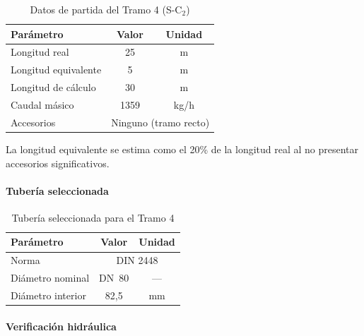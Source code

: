 \documentclass[12pt]{article}
\begin{document}
\begin{table}[H]
	\centering
	\caption{Datos de partida del Tramo 4 (S-C$_2$)}
	\label{tab:datos-tramo4}
	\begin{tabular}{lcc}
		\toprule
		\textbf{Parámetro}   & \textbf{Valor}                            & \textbf{Unidad} \\
		\midrule
		Longitud real        & 25                                        & m               \\
		Longitud equivalente & 5                                         & m               \\
		Longitud de cálculo  & 30                                        & m               \\
		Caudal másico        & 1359                                      & kg/h            \\
		Accesorios           & \multicolumn{2}{c}{Ninguno (tramo recto)}                   \\
		\bottomrule
	\end{tabular}
\end{table}

La longitud equivalente se estima como el 20\% de la longitud real al no presentar accesorios significativos.

\paragraph{Tubería seleccionada}

\begin{table}[H]
	\centering
	\caption{Tubería seleccionada para el Tramo 4}
	\label{tab:tuberia-tramo4}
	\begin{tabular}{lcc}
		\toprule
		\textbf{Parámetro} & \textbf{Valor}               & \textbf{Unidad} \\
		\midrule
		Norma              & \multicolumn{2}{c}{DIN 2448}                   \\
		Diámetro nominal   & DN~80                        & ---             \\
		Diámetro interior  & 82{,}5                       & mm              \\
		\bottomrule
	\end{tabular}
\end{table}

\paragraph{Verificación hidráulica}
\end{document}
